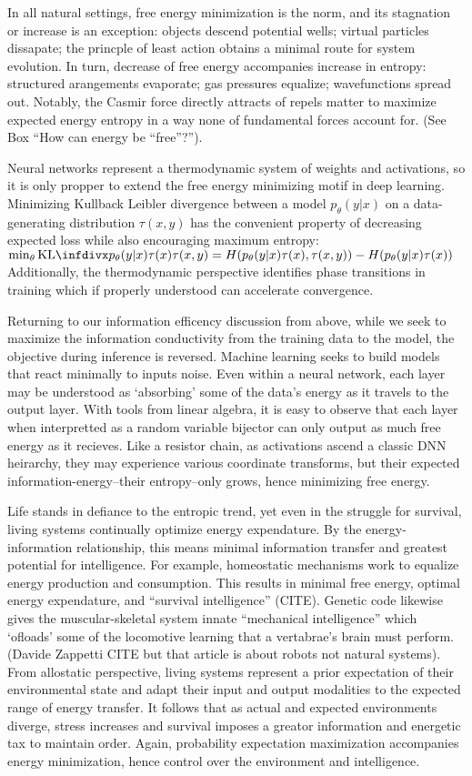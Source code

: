 In all natural settings, free energy minimization is the norm, and its stagnation or increase is an exception: objects descend potential wells; virtual particles dissapate; the princple of least action obtains a minimal route for system evolution. In turn, decrease of free energy accompanies increase in entropy: structured arangements evaporate; gas pressures equalize; wavefunctions spread out. Notably, the Casmir force directly attracts of repels matter to maximize expected energy entropy in a way none of fundamental forces account for. (See Box ``How can energy be ``free''?'').

Neural networks represent a thermodynamic system of weights and activations, so it is only propper to extend the free energy minimizing motif in deep learning. Minimizing Kullback Leibler divergence between a model $p_\theta(y|x)$ on a data-generating distribution $\tau(x,y)$ has the convenient property of decreasing expected loss while also encouraging maximum entropy: $\min_\theta \kld{ p_\theta(y|x)\tau(x) }{ \tau(x,y) } = H(p_\theta(y|x)\tau(x), \tau(x,y)) - H(p_\theta(y|x)\tau(x))$ Additionally, the thermodynamic perspective identifies phase transitions in training which if properly understood can accelerate convergence.

Returning to our information efficency discussion from above, while we seek to maximize the information conductivity from the training data to the model, the objective during inference is reversed. Machine learning seeks to build models that react minimally to inputs noise. Even within a neural network, each layer may be understood as `absorbing' some of the data's energy as it travels to the output layer. With tools from linear algebra, it is easy to observe that each layer when interpretted as a random variable bijector can only output as much free energy as it recieves. Like a resistor chain, as activations ascend a classic DNN heirarchy, they may experience various coordinate transforms, but their expected information-energy--their entropy--only grows, hence minimizing free energy.

Life stands in defiance to the entropic trend, yet even in the struggle for survival, living systems continually optimize energy expendature. By the energy-information relationship, this means minimal information transfer and greatest potential for intelligence. For example, homeostatic mechanisms work to equalize energy production and consumption. This results in minimal free energy, optimal energy expendature, and ``survival intelligence'' (CITE). Genetic code likewise gives the muscular-skeletal system innate ``mechanical intelligence'' which `ofloads' some of the locomotive learning that a vertabrae's brain must perform. (Davide Zappetti CITE but that article is about robots not natural systems). From allostatic perspective, living systems represent a prior expectation of their environmental state and adapt their input and output modalities to the expected range of energy transfer. It follows that as actual and expected environments diverge, stress increases and survival imposes a greator information and energetic tax to maintain order. Again, probability expectation maximization accompanies energy minimization, hence control over the environment and intelligence.

